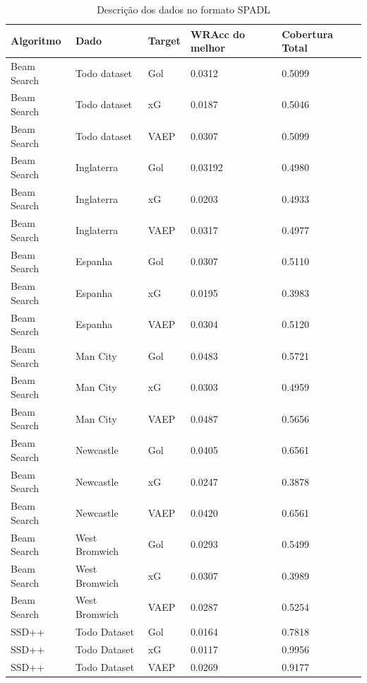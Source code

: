 \documentclass{article}
\begin{document}
\begin{table}[H]
	\centering
	\label{tab:resultMetricas}
	\begin{tabular}{|l|l|l|l|l|}
		\hline
		\textbf{Algoritmo} & \textbf{Dado} &  \textbf{Target} & 
		\textbf{WRAcc do melhor} & \textbf{Cobertura Total}
		\\
		\hline
		Beam Search & Todo dataset & Gol & 0.0312 & 0.5099 
		\\
		\hline
		Beam Search & Todo dataset & xG & 0.0187 & 0.5046 
		\\
		\hline
		Beam Search & Todo dataset & VAEP & 0.0307 & 0.5099 
		\\
		\hline
		Beam Search & Inglaterra & Gol & 0.03192 & 0.4980 
		\\
		\hline
		Beam Search & Inglaterra & xG & 0.0203 & 0.4933 
		\\
		\hline
		Beam Search & Inglaterra & VAEP & 0.0317 & 0.4977
		\\
		\hline
		Beam Search & Espanha & Gol & 0.0307 & 0.5110 
		\\
		\hline
		Beam Search & Espanha & xG & 0.0195 & 0.3983 
		\\
		\hline
		Beam Search & Espanha & VAEP & 0.0304 & 0.5120 
		\\
		\hline
		Beam Search & Man City & Gol & 0.0483 & 0.5721 
		\\
		\hline
		Beam Search & Man City & xG & 0.0303 & 0.4959 
		\\
		\hline
		Beam Search & Man City & VAEP & 0.0487 & 0.5656 
		\\
		\hline
		Beam Search & Newcastle & Gol & 0.0405 & 0.6561 
		\\
		\hline
		Beam Search & Newcastle & xG & 0.0247 & 0.3878 
		\\
		\hline
		Beam Search & Newcastle & VAEP & 0.0420 & 0.6561 
		\\
		\hline
		Beam Search & West Bromwich & Gol & 0.0293 & 0.5499 
		\\
		\hline
		Beam Search & West Bromwich & xG & 0.0307 & 0.3989 
		\\
		\hline
		Beam Search & West Bromwich & VAEP & 0.0287 & 0.5254 
		\\
		\hline
		SSD++ & Todo Dataset & Gol & 0.0164 & 0.7818 
		\\
		\hline
		SSD++ & Todo Dataset & xG & 0.0117 & 0.9956
		\\
		\hline
		SSD++ & Todo Dataset & VAEP & 0.0269 & 0.9177
		\\
		\hline
	\end{tabular}
	\caption{Descrição dos dados no formato SPADL}
\end{table}
\end{document}

